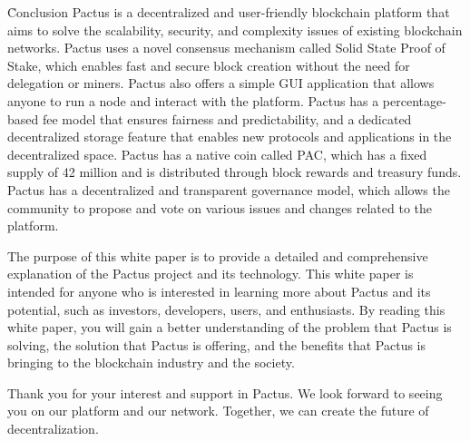 \documentclass{novel}
\begin{document}
\h{Conclusion}
Pactus is a decentralized and user-friendly blockchain platform that aims to solve the scalability, security, and complexity issues of existing blockchain networks. Pactus uses a novel consensus mechanism called Solid State Proof of Stake, which enables fast and secure block creation without the need for delegation or miners. Pactus also offers a simple GUI application that allows anyone to run a node and interact with the platform. Pactus has a percentage-based fee model that ensures fairness and predictability, and a dedicated decentralized storage feature that enables new protocols and applications in the decentralized space. Pactus has a native coin called PAC, which has a fixed supply of 42 million and is distributed through block rewards and treasury funds. Pactus has a decentralized and transparent governance model, which allows the community to propose and vote on various issues and changes related to the platform.

The purpose of this white paper is to provide a detailed and comprehensive explanation of the Pactus project and its technology. This white paper is intended for anyone who is interested in learning more about Pactus and its potential, such as investors, developers, users, and enthusiasts. By reading this white paper, you will gain a better understanding of the problem that Pactus is solving, the solution that Pactus is offering, and the benefits that Pactus is bringing to the blockchain industry and the society.

Thank you for your interest and support in Pactus. We look forward to seeing you on our platform and our network. Together, we can create the future of decentralization.
\end{document}
